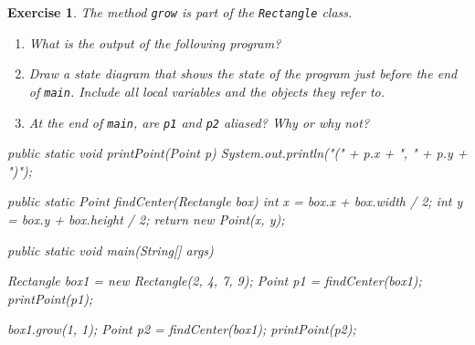 \documentclass[12pt]{book}
\theoremstyle{exercise}
\newtheorem{exercise}{Exercise}[chapter]
\newcommand{\java}[1]{\verb"#1"}
\newcommand{\java}[1]{\lstinline{#1}} %
\begin{document}
\begin{exercise}
The method \java{grow} is part of the \java{Rectangle} class.

\begin{enumerate}

\item What is the output of the following program?

\item Draw a state diagram that shows the state of the program just before the end of \java{main}.
Include all local variables and the objects they refer to.

\item At the end of \java{main}, are \java{p1} and \java{p2} aliased?
Why or why not?

\end{enumerate}

\begin{code}
    public static void printPoint(Point p) {
        System.out.println("(" + p.x + ", " + p.y + ")");
    }

    public static Point findCenter(Rectangle box) {
        int x = box.x + box.width / 2;
        int y = box.y + box.height / 2;
        return new Point(x, y);
    }

    public static void main(String[] args) {
        Rectangle box1 = new Rectangle(2, 4, 7, 9);
        Point p1 = findCenter(box1);
        printPoint(p1);

        box1.grow(1, 1);
        Point p2 = findCenter(box1);
        printPoint(p2);
    }
\end{code}

\end{exercise}
\end{document}
